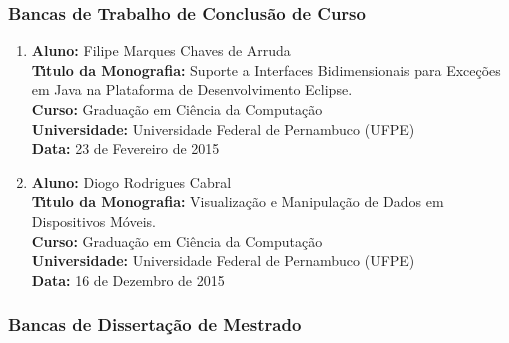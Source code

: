 \documentclass[a4paper,oneside,10pt]{article}
\begin{document}

\subsubsection{Bancas de Trabalho de Conclus\~{a}o de Curso}
\vspace{0.3cm}

\begin{enumerate}
\renewcommand{\labelenumi}{{\large\bfseries\arabic{enumi}.}}
\vspace{0.3cm}

\item       \textbf{Aluno:} Filipe Marques Chaves de Arruda \mbox{}\\
            \textbf{T\'{\i}tulo da Monografia:} Suporte a Interfaces Bidimensionais para Exceções em Java na Plataforma de Desenvolvimento Eclipse.\\
            \textbf{Curso:} Graduação em Ciência da Computação\\
            \textbf{Universidade:} Universidade Federal de Pernambuco (UFPE)\\
            \textbf{Data:} 23 de Fevereiro de 2015\\

\item       \textbf{Aluno:} Diogo Rodrigues Cabral \mbox{}\\
            \textbf{T\'{\i}tulo da Monografia:} Visualização e Manipulação de Dados em Dispositivos Móveis.\\
            \textbf{Curso:} Graduação em Ciência da Computação\\
            \textbf{Universidade:} Universidade Federal de Pernambuco (UFPE)\\
            \textbf{Data:} 16 de Dezembro de 2015\\

\end{enumerate}


\subsubsection{Bancas de Disserta\c{c}\~{a}o de Mestrado}
\vspace{0.3cm}
\end{document}
